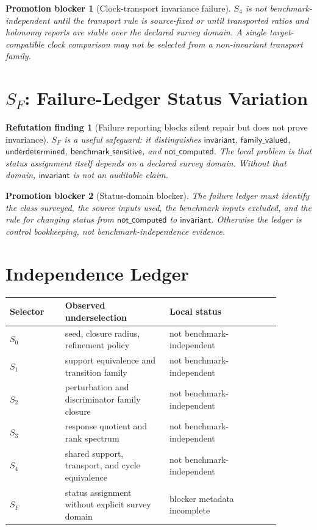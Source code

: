 \documentclass[11pt]{article}
\newtheorem{finding}{Refutation finding}
\newtheorem{blocker}{Promotion blocker}
\begin{document}
\begin{blocker}[Clock-transport invariance failure]
\(S_4\) is not benchmark-independent until the transport rule is source-fixed
or until transported ratios and holonomy reports are stable over the declared
survey domain. A single target-compatible clock comparison may not be selected
from a non-invariant transport family.
\end{blocker}

\section{\texorpdfstring{\(S_F\)}{SF}: Failure-Ledger Status Variation}

\begin{finding}[Failure reporting blocks silent repair but does not prove invariance]
\(S_F\) is a useful safeguard: it distinguishes \(\mathsf{invariant}\),
\(\mathsf{family\_valued}\), \(\mathsf{underdetermined}\),
\(\mathsf{benchmark\_sensitive}\), and \(\mathsf{not\_computed}\). The local
problem is that status assignment itself depends on a declared survey domain.
Without that domain, \(\mathsf{invariant}\) is not an auditable claim.
\end{finding}

\begin{blocker}[Status-domain blocker]
The failure ledger must identify the class surveyed, the source inputs used,
the benchmark inputs excluded, and the rule for changing status from
\(\mathsf{not\_computed}\) to \(\mathsf{invariant}\). Otherwise the ledger is
control bookkeeping, not benchmark-independence evidence.
\end{blocker}

\section{Independence Ledger}

\begin{center}
\begin{tabular}{p{0.18\linewidth}p{0.34\linewidth}p{0.36\linewidth}}
\textbf{Selector} & \textbf{Observed underselection} & \textbf{Local status} \\
\hline
\(S_0\) & seed, closure radius, refinement policy & not benchmark-independent \\
\(S_1\) & support equivalence and transition family & not benchmark-independent \\
\(S_2\) & perturbation and discriminator family closure & not benchmark-independent \\
\(S_3\) & response quotient and rank spectrum & not benchmark-independent \\
\(S_4\) & shared support, transport, and cycle equivalence & not benchmark-independent \\
\(S_F\) & status assignment without explicit survey domain & blocker metadata incomplete \\
\end{tabular}
\end{center}
\end{document}

